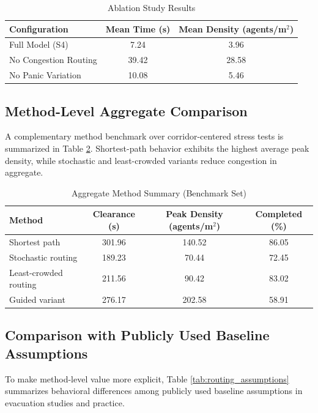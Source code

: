 \documentclass[journal]{IEEEtran}
\begin{document}
\begin{table}[t]
\centering
\caption{Ablation Study Results}
\label{tab:ablation}
\begin{tabular}{lcc}
\toprule
\textbf{Configuration} & \textbf{Mean Time (s)} & \textbf{Mean Density (agents/m$^2$)} \\
\midrule
Full Model (S4) & 7.24 & 3.96 \\
No Congestion Routing & 39.42 & 28.58 \\
No Panic Variation & 10.08 & 5.46 \\
\bottomrule
\end{tabular}
\end{table}

\subsection{Method-Level Aggregate Comparison}
A complementary method benchmark over corridor-centered stress tests is summarized in Table \ref{tab:method_summary}. Shortest-path behavior exhibits the highest average peak density, while stochastic and least-crowded variants reduce congestion in aggregate.

\begin{table}[t]
\centering
\caption{Aggregate Method Summary (Benchmark Set)}
\label{tab:method_summary}
{\footnotesize
\setlength{\tabcolsep}{2.5pt}
\begin{tabular}{>{\raggedright\arraybackslash}p{1.95cm}ccc}
\toprule
\textbf{Method} & \textbf{Clearance (s)} & \textbf{Peak Density (agents/m$^2$)} & \textbf{Completed (\%)} \\
\midrule
Shortest path & 301.96 & 140.52 & 86.05 \\
Stochastic routing & 189.23 & 70.44 & 72.45 \\
Least-crowded routing & 211.56 & 90.42 & 83.02 \\
Guided variant & 276.17 & 202.58 & 58.91 \\
\bottomrule
\end{tabular}
}
\end{table}

\subsection{Comparison with Publicly Used Baseline Assumptions}
To make method-level value more explicit, Table \ref{tab:routing_assumptions} summarizes behavioral differences among publicly used baseline assumptions in evacuation studies and practice.
\end{document}
